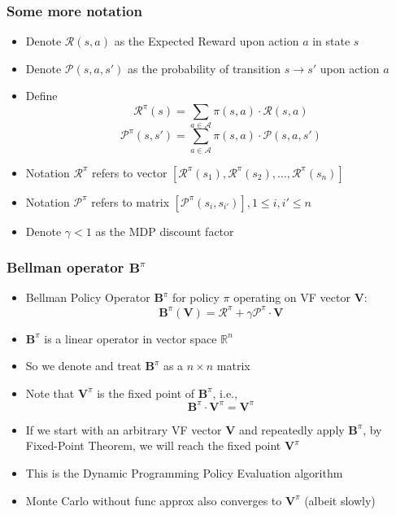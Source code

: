 \documentclass[handout]{beamer}
\newcommand{\vpi}{\bm{V}^{\pi}}
\newcommand{\bb}{\bm{B}^{\pi}}
\newcommand{\bv}{\bm{V}}
\newcommand{\brew}{\bm{\mathcal{R}}^{\pi}}
\newcommand{\bprob}{\bm{\mathcal{P}}^{\pi}}
\begin{document}
\begin{frame}
\frametitle{Some more notation}
\pause
\begin{itemize}[<+->]
\item Denote $\mathcal{R}(s,a)$ as the Expected Reward upon action $a$ in state $s$
\item Denote $\mathcal{P}(s,a,s')$ as the probability of transition $s \rightarrow s'$ upon action $a$
\item Define
$$\brew(s) = \sum_{a \in \mathcal{A}} \pi(s, a) \cdot \mathcal{R}(s,a)$$
$$\bprob(s,s') = \sum_{a \in \mathcal{A}} \pi(s, a) \cdot \mathcal{P}(s,a,s')$$
\item Notation $\brew$ refers to vector $[\brew(s_1), \brew(s_2), \ldots, \brew(s_n)]$
\item Notation $\bprob$ refers to matrix $[\bprob(s_i, s_{i'})], 1 \leq i, i' \leq n$ 
\item Denote $\gamma < 1$ as the MDP discount factor
\end{itemize}
\end{frame}

\begin{frame}
\frametitle{Bellman operator $\bb$}
\pause
\begin{itemize}[<+->]
\item Bellman Policy Operator $\bb$ for policy $\pi$ operating on VF vector $\bv$:
$$\bb (\bv) = \bm{\mathcal{R}}^{\pi} + \gamma \bm{\mathcal{P}}^{\pi} \cdot \bv$$
\item $\bb$ is a linear operator in vector space $\mathbb{R}^n$
\item So we denote and treat $\bb$ as a $n \times n$ matrix
\item Note that $\vpi$ is the fixed point of $\bb$, i.e.,
$$\bb \cdot \vpi = \vpi$$
\item If we start with an arbitrary VF vector $\bv$ and repeatedly apply $\bb$, 
by Fixed-Point Theorem, we will reach the fixed point $\vpi$
\item This is the Dynamic Programming Policy Evaluation algorithm
\item Monte Carlo without func approx also converges to $\vpi$ (albeit slowly)
\end{itemize}
\end{frame}
\end{document}
